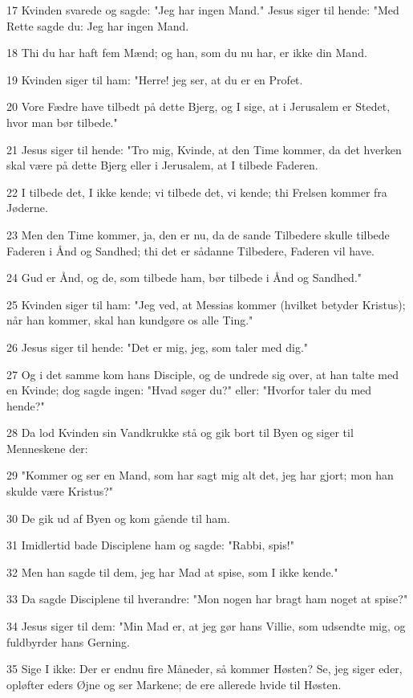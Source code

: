 \par 17 Kvinden svarede og sagde: "Jeg har ingen Mand." Jesus siger til hende: "Med Rette sagde du: Jeg har ingen Mand.
\par 18 Thi du har haft fem Mænd; og han, som du nu har, er ikke din Mand.
\par 19 Kvinden siger til ham: "Herre! jeg ser, at du er en Profet.
\par 20 Vore Fædre have tilbedt på dette Bjerg, og I sige, at i Jerusalem er Stedet, hvor man bør tilbede."
\par 21 Jesus siger til hende: "Tro mig, Kvinde, at den Time kommer, da det hverken skal være på dette Bjerg eller i Jerusalem, at I tilbede Faderen.
\par 22 I tilbede det, I ikke kende; vi tilbede det, vi kende; thi Frelsen kommer fra Jøderne.
\par 23 Men den Time kommer, ja, den er nu, da de sande Tilbedere skulle tilbede Faderen i Ånd og Sandhed; thi det er sådanne Tilbedere, Faderen vil have.
\par 24 Gud er Ånd, og de, som tilbede ham, bør tilbede i Ånd og Sandhed."
\par 25 Kvinden siger til ham: "Jeg ved, at Messias kommer (hvilket betyder Kristus); når han kommer, skal han kundgøre os alle Ting."
\par 26 Jesus siger til hende: "Det er mig, jeg, som taler med dig."
\par 27 Og i det samme kom hans Disciple, og de undrede sig over, at han talte med en Kvinde; dog sagde ingen: "Hvad søger du?" eller: "Hvorfor taler du med hende?"
\par 28 Da lod Kvinden sin Vandkrukke stå og gik bort til Byen og siger til Menneskene der:
\par 29 "Kommer og ser en Mand, som har sagt mig alt det, jeg har gjort; mon han skulde være Kristus?"
\par 30 De gik ud af Byen og kom gående til ham.
\par 31 Imidlertid bade Disciplene ham og sagde: "Rabbi, spis!"
\par 32 Men han sagde til dem, jeg har Mad at spise, som I ikke kende."
\par 33 Da sagde Disciplene til hverandre: "Mon nogen har bragt ham noget at spise?"
\par 34 Jesus siger til dem: "Min Mad er, at jeg gør hans Villie, som udsendte mig, og fuldbyrder hans Gerning.
\par 35 Sige I ikke: Der er endnu fire Måneder, så kommer Høsten? Se, jeg siger eder, opløfter eders Øjne og ser Markene; de ere allerede hvide til Høsten.
